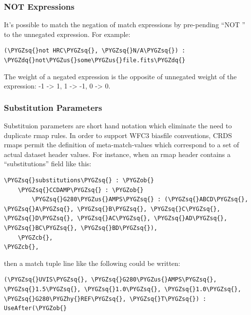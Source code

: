 \documentclass[letterpaper,10pt,english]{sphinxmanual}
\def\PYGZus{\char`\_}
\def\PYGZob{\char`\{}
\def\PYGZcb{\char`\}}
\def\PYGZhy{\char`\-}
\def\PYGZsq{\char`\'}
\def\PYGZdq{\char`\"}
\begin{document}
\subsubsection{NOT Expressions}
\label{rmap_syntax:not-expressions}
It's possible to match the negation of match expressions by pre-pending ``NOT ''
to the unnegated expression.   For example:

\begin{Verbatim}[commandchars=\\\{\}]
(\PYGZsq{}not HRC\PYGZsq{}, \PYGZsq{}N/A\PYGZsq{}) :  \PYGZdq{}not\PYGZus{}some\PYGZus{}file.fits\PYGZdq{}
\end{Verbatim}

The weight of a negated expression is the opposite of unnegated weight of the
expression: -1 -\textgreater{} 1, 1 -\textgreater{} -1, 0 -\textgreater{} 0.


\subsubsection{Substitution Parameters}
\label{rmap_syntax:substitution-parameters}
Substituion parameters are short hand notation which eliminate the need to
duplicate rmap rules.  In order to support WFC3 biasfile conventions,  CRDS
rmaps permit the definition of meta-match-values which correspond to a set of
actual dataset header values. For instance,  when an rmap header contains a
``substitutions'' field like this:

\begin{Verbatim}[commandchars=\\\{\}]
\PYGZsq{}substitutions\PYGZsq{} : \PYGZob{}
    \PYGZsq{}CCDAMP\PYGZsq{} : \PYGZob{}
        \PYGZsq{}G280\PYGZus{}AMPS\PYGZsq{} : (\PYGZsq{}ABCD\PYGZsq{}, \PYGZsq{}A\PYGZsq{}, \PYGZsq{}B\PYGZsq{}, \PYGZsq{}C\PYGZsq{}, \PYGZsq{}D\PYGZsq{}, \PYGZsq{}AC\PYGZsq{}, \PYGZsq{}AD\PYGZsq{}, \PYGZsq{}BC\PYGZsq{}, \PYGZsq{}BD\PYGZsq{}),
    \PYGZcb{},
\PYGZcb{},
\end{Verbatim}

then a match tuple line like the following could be written:

\begin{Verbatim}[commandchars=\\\{\}]
(\PYGZsq{}UVIS\PYGZsq{}, \PYGZsq{}G280\PYGZus{}AMPS\PYGZsq{}, \PYGZsq{}1.5\PYGZsq{}, \PYGZsq{}1.0\PYGZsq{}, \PYGZsq{}1.0\PYGZsq{}, \PYGZsq{}G280\PYGZhy{}REF\PYGZsq{}, \PYGZsq{}T\PYGZsq{}) : UseAfter(\PYGZob{}
\end{Verbatim}
\end{document}
